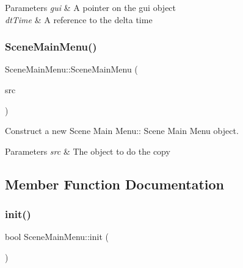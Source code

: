 \begin{DoxyParams}{Parameters}
{\em gui} & A pointer on the gui object \\
\hline
{\em dt\+Time} & A reference to the delta time \\
\hline
\end{DoxyParams}
\mbox{\label{class_scene_main_menu_a009e4094fbfa50f69b1f38f021d882c6}} 
\subsubsection{\texorpdfstring{Scene\+Main\+Menu()}{SceneMainMenu()}\hspace{0.1cm}{\footnotesize\ttfamily [2/2]}}
{\footnotesize\ttfamily Scene\+Main\+Menu\+::\+Scene\+Main\+Menu (\begin{DoxyParamCaption}\item[{\hyperlink{class_scene_main_menu}{Scene\+Main\+Menu} const \&}]{src }\end{DoxyParamCaption})}



Construct a new Scene Main Menu\+:\+: Scene Main Menu object. 


\begin{DoxyParams}{Parameters}
{\em src} & The object to do the copy \\
\hline
\end{DoxyParams}


\subsection{Member Function Documentation}
\mbox{\label{class_scene_main_menu_a11f68db49f9bf996efb0ce14913e5580}} 
\subsubsection{\texorpdfstring{init()}{init()}}
{\footnotesize\ttfamily bool Scene\+Main\+Menu\+::init (\begin{DoxyParamCaption}{ }\end{DoxyParamCaption})\hspace{0.3cm}{\ttfamily [virtual]}}



